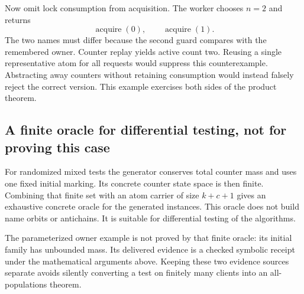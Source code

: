 Now omit lock consumption from acquisition. The worker chooses $n=2$ and
returns
\[
 \operatorname{acquire}(0),\qquad\operatorname{acquire}(1).
\]
The two names must differ because the second guard compares with the remembered
owner. Counter replay yields active count two. Reusing a single representative
atom for all requests would suppress this counterexample. Abstracting away
counters without retaining consumption would instead falsely reject the correct
version. This example exercises both sides of the product theorem.

\subsection{A finite oracle for differential testing, not for proving this case}
For randomized mixed tests the generator conserves total counter mass and uses
one fixed initial marking. Its concrete counter state space is then finite.
Combining that finite set with an atom carrier of size $k+c+1$ gives an exhaustive
concrete oracle for the generated instances. This oracle does not build name
orbits or antichains. It is suitable for differential testing of the algorithms.

The parameterized owner example is not proved by that finite oracle: its
initial family has unbounded mass. Its delivered evidence is a checked symbolic
receipt under the mathematical arguments above. Keeping these two evidence
sources separate avoids silently converting a test on finitely many clients
into an all-populations theorem.
